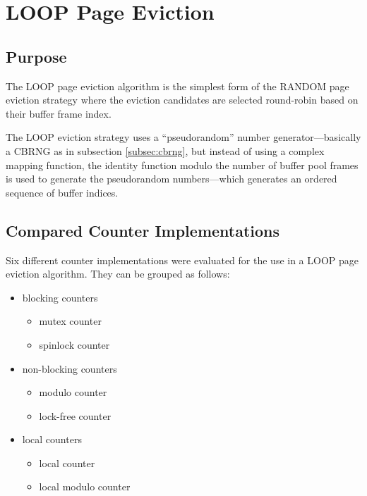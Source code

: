 \chapter[LOOP Page Eviction]{LOOP Page Eviction} \label{ch:loop}

\section[Purpose]{Purpose}

    The LOOP page eviction algorithm is the simplest form of the RANDOM page eviction strategy where the eviction candidates are selected round-robin based on their buffer frame index.

    The LOOP eviction strategy uses a ``pseudorandom'' number generator---basically a CBRNG as in subsection \ref{subsec:cbrng}, but instead of using a complex mapping function, the identity function modulo the number of buffer pool frames is used to generate the pseudorandom numbers---which generates an ordered sequence of buffer indices.

\section[Compared Counter Implementations]{Compared Counter Implementations}

    Six different counter implementations were evaluated for the use in a LOOP page eviction algorithm. They can be grouped as follows:

\begin{@empty}
    \begin{itemize}
        \itemsep0em
        \item blocking counters
              \begin{itemize}
              \itemsep0em
                  \item mutex counter
                  \item spinlock counter
              \end{itemize}
        \item non-blocking counters
              \begin{itemize}
                  \itemsep0em
                  \item modulo counter
                  \item lock-free counter
              \end{itemize}
        \item local counters
              \begin{itemize}
                  \itemsep0em
                  \item local counter
                  \item local modulo counter
              \end{itemize}
    \end{itemize}
\end{@empty}

